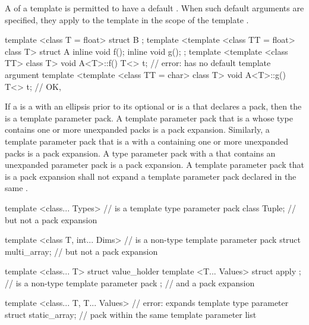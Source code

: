 \pnum
A
of a template
is permitted to have a default
.
When such default arguments are specified, they apply to the template
in the scope of the template
.
\begin{example}
\begin{codeblock}
template <class T = float> struct B {};
template <template <class TT = float> class T> struct A {
  inline void f();
  inline void g();
};
template <template <class TT> class T> void A<T>::f() {
  T<> t;            // error:  has no default template argument
}
template <template <class TT = char> class T> void A<T>::g() {
  T<> t;            // OK, 
}
\end{codeblock}
\end{example}

\pnum
If a  is a
 with an ellipsis prior to its
optional  or is a
 that declares a
pack, then the 
is a template parameter pack.
A template parameter pack that is a  whose type
contains one or more unexpanded packs is a pack expansion. Similarly,
a template parameter pack that is a  with a
 containing one or more unexpanded
packs is a pack expansion.
A type parameter pack with a  that
contains an unexpanded parameter pack is a pack expansion.
A template parameter pack that is a pack
expansion shall not expand a template parameter pack declared in the same
.
\begin{example}
\begin{codeblock}
template <class... Types>                       //  is a template type parameter pack
   class Tuple;                                 // but not a pack expansion

template <class T, int... Dims>                 //  is a non-type template parameter pack
   struct multi_array;                          // but not a pack expansion

template <class... T>
  struct value_holder {
    template <T... Values> struct apply { };    //  is a non-type template parameter pack
  };                                            // and a pack expansion

template <class... T, T... Values>              // error:  expands template type parameter
  struct static_array;                          // pack  within the same template parameter list
\end{codeblock}
\end{example}

